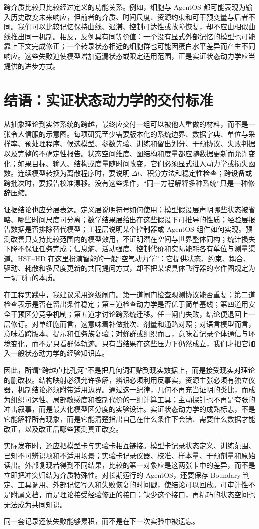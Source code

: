 跨介质比较只比较经过定义的功能关系。例如，细胞与 AgentOS 都可能表现为输入历史改变未来响应，但前者的介质、时间尺度、资源约束和可干预变量与后者不同。我们可以比较记忆保持曲线、迟滞、控制可达性或故障恢复，却不应由相似曲线推出同一机制。相反，反例具有同等价值：一个没有显式外部记忆的模型也可能靠上下文完成修正；一个转录状态相近的细胞群也可能因蛋白水平差异而产生不同响应。这些失败迫使模型增加遗漏状态或限定适用范围，正是实证状态动力学应当提供的进步方式。

\section{结语：实证状态动力学的交付标准}
\label{sec:conclusion_empirical_geo_comp}

从抽象理论到实体系统的跨越，最终应交付一组可以被他人重做的材料，而不是一张令人信服的示意图。每项研究至少需要版本化的系统边界、数据字典、单位与采样率、预处理程序、候选模型、参数先验、训练和留出划分、干预协议、失败判据以及完整的不确定性报告。状态空间维度、图结构和度量都应随数据更新而允许变化；如果目标、输入、结构或度量随时间改变，它们必须显式进入动力学或损失函数。连续模型转换为离散程序时，要说明 $\Delta t$、积分方法和稳定性检查；跨设备或跨批次时，要报告校准漂移。没有这些条件，“同一方程解释多种系统”只是一种修辞压缩。

证据结论也应分层表达。定义层说明符号如何使用；模型假设层声明哪些状态被省略、哪些时间尺度可分离；数学结果层给出在这些假设下可推导的性质；经验层报告数据是否排除替代模型；工程层说明某个控制器或 AgentOS 组件如何实现。预测改善只支持比较范围内的模型效用，不证明潜在空间与世界整体同构；统计损失下降不保证任务完成；信息熵、活动强度、控制代价和实际能耗各有单位与测量渠道。HSF--HD 在这里扮演智能的一般“空气动力学”：它提供状态、约束、耦合、驱动、耗散和多尺度更新的共同提问方式，却不把某架具体飞行器的零件图规定为一切飞行的本质。

在工程实践中，我建议采用逐级闸门。第一道闸门检查观测协议能否重复；第二道检查表示是否在留出条件稳定；第三道检查动力学是否优于简单基线；第四道用安全干预区分竞争机制；第五道才讨论跨系统迁移。任一闸门失败，结论便退回上一层修订。对单细胞而言，这意味着补做批次、剂量和通路对照；对语言模型而言，意味着跨版本、提示和任务族复验；对蜂群或组织而言，意味着记录个体通信与环境变化，而不是只看群体轨迹。只有当结果在这些压力下仍然成立，我们才把它加入一般状态动力学的经验知识库。

因此，所谓“跨越卢比孔河”不是把几何词汇贴到现实数据上，而是接受现实对理论的删改权。结构映射必须允许多解，辨识必须利用反事实，资源主张必须有独立仪器，机制结论必须附带适用边界。通过这一纪律，几何不再充当证明的类比，而成为组织可达性、局部敏感度和控制代价的一组计算工具；主动探针也不再是夸张的冲击叙事，而是最大化模型区分度的实验设计。实证状态动力学的成熟标志，不是它能解释所有现象，而是它能清楚指出自己在什么条件下会错、需要什么数据才能改正，以及改正后哪些预测真正改变。

实际发布时，还应把模型卡与实验卡相互链接。模型卡记录状态定义、训练范围、已知不可辨识项和不适用场景；实验卡记录仪器、校准、样本量、干预剂量和原始读出。外部复现若得到不同结果，比较的第一对象应是这两张卡中的差异，而不是立即把冲突归结为介质特殊性。对长期运行的 AgentOS，还要保存 Boundary 判定、工具调用、外部记忆写入和失败恢复的时间戳，使结论可以回放。可审计性不是附属文档，而是理论接受经验修正的接口；缺少这个接口，再精巧的状态空间也无法成为共同知识。

同一套记录还使失败能够累积，而不是在下一次实验中被遗忘。


